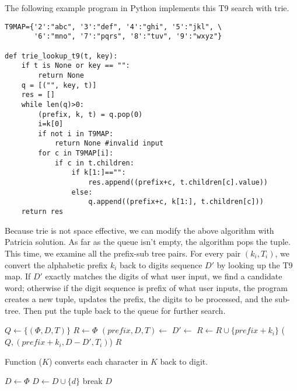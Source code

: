 \documentclass[UTF8]{article}
\begin{document}
The following example program in Python implements this T9 search with trie.

\lstset{language=Python}
\begin{lstlisting}
T9MAP={'2':"abc", '3':"def", '4':"ghi", '5':"jkl", \
       '6':"mno", '7':"pqrs", '8':"tuv", '9':"wxyz"}

def trie_lookup_t9(t, key):
    if t is None or key == "":
        return None
    q = [("", key, t)]
    res = []
    while len(q)>0:
        (prefix, k, t) = q.pop(0)
        i=k[0]
        if not i in T9MAP:
            return None #invalid input
        for c in T9MAP[i]:
            if c in t.children:
                if k[1:]=="":
                    res.append((prefix+c, t.children[c].value))
                else:
                    q.append((prefix+c, k[1:], t.children[c]))
    return res
\end{lstlisting}

Because trie is not space effective, we can modify the above algorithm with
Patricia solution. As far as the queue isn't empty, the algorithm pops the
tuple. This time, we examine all the prefix-sub tree pairs. For every pair
$(k_i, T_i)$, we convert the alphabetic prefix $k_i$ back to digits sequence $D'$
by looking up the T9 map. If $D'$ exactly matches the digits of what user input,
we find a candidate word; otherwise if the digit sequence is prefix of what user inputs,
the program creates a new tuple, updates the prefix, the digits to be processed,
and the sub-tree. Then put the tuple back to the queue for further search.

\begin{algorithmic}[1]
  \State $Q \gets \{(\Phi, D, T)\}$
  \State $R \gets \Phi$
    \State $(prefix, D, T) \gets$ 
      \State $D' \gets$ 
       
          \State $R \gets R \cup \{prefix + k_i\}$
        \Else
          \State {}($Q, (prefix + k_i, D - D', T_i)$)
        \EndIf
      \EndIf
    \EndFor
  \EndWhile
  \State \Return $R$
\EndFunction
\end{algorithmic}

Function ($K$) converts each character in $K$ back to digit.

\begin{algorithmic}[1]
  \State $D \gets \Phi$
         \State $D \gets D \cup \{d\}$
         \State break
       \EndIf
     \EndFor
  \EndFor
  \State \Return $D$
\EndFunction
\end{algorithmic}
\end{document}

